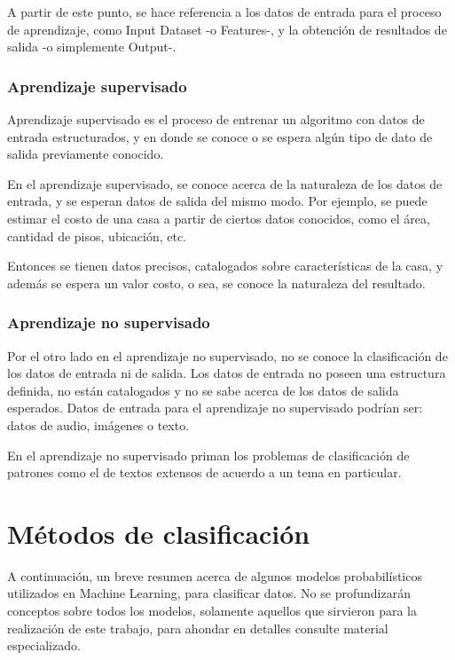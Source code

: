 \documentclass[a4paper,12pt,oneside,spanish]{book}
\begin{document}
A partir de este punto, se hace referencia a los datos de entrada para el proceso de aprendizaje, como Input Dataset -o Features-, y la obtención de resultados de salida -o simplemente Output-.\par

\subsubsection{Aprendizaje supervisado}

Aprendizaje supervisado es el proceso de entrenar un algoritmo con datos de entrada estructurados, y en donde se conoce o se espera algún tipo de dato de salida previamente conocido. \par

En el aprendizaje supervisado, se conoce acerca de la naturaleza de los datos de entrada, y se esperan datos de salida del mismo modo. Por ejemplo, se puede estimar el costo de una casa a partir de ciertos datos conocidos, como el área, cantidad de pisos, ubicación, etc.  \par

Entonces se tienen datos precisos, catalogados sobre características de la casa, y además se espera un valor costo, o sea, se conoce la naturaleza del resultado.\par

\subsubsection{Aprendizaje no supervisado}

Por el otro lado en el aprendizaje no supervisado, no se conoce la clasificación de los datos de entrada ni de salida. Los datos de entrada no poseen una estructura definida, no están catalogados y no se sabe acerca de los datos de salida esperados. Datos de entrada para el aprendizaje no supervisado podrían ser: datos de audio, imágenes o texto. \par

En el aprendizaje no supervisado priman los problemas de clasificación de patrones como el de textos extensos de acuerdo a un tema en particular.\par

\section{Métodos de clasificación}\label{clasificacion}
A continuación, un breve resumen acerca de algunos modelos probabilísticos utilizados en Machine Learning, para clasificar datos. No se profundizarán conceptos sobre todos los modelos, solamente aquellos que sirvieron para la realización de este trabajo, para ahondar en detalles consulte material especializado.\par
\end{document}
